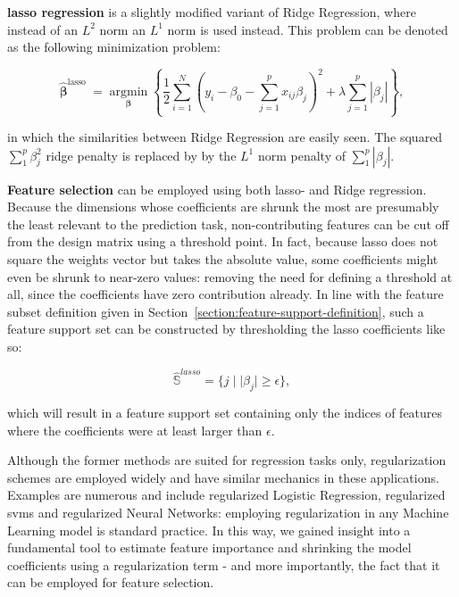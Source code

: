 \documentclass[../main.tex]{subfiles}
\begin{document}
\textbf{\gls{lasso} regression} is a slightly modified variant of Ridge Regression, where instead of an $L^2$ norm an $L^1$ norm is used instead. This problem can be denoted as the following minimization problem:

\begin{equation}
\hat{\boldsymbol{\beta}}^{\text {lasso }}=\underset{\boldsymbol{\beta}}{\operatorname{argmin}}\left\{\frac{1}{2} \sum_{i=1}^{N}\left(y_{i}-\beta_{0}-\sum_{j=1}^{p} x_{i j} \beta_{j}\right)^{2}+\lambda \sum_{j=1}^{p}\left|\beta_{j}\right|\right\},
\end{equation}

in which the similarities between Ridge Regression are easily seen. The squared $\sum_1^p \beta^2_j$ ridge penalty is replaced by by the $L^1$ norm penalty of $\sum_1^p |\beta_j|$.

\textbf{Feature selection} can be employed using both \gls{lasso}- and Ridge regression. Because the dimensions whose coefficients are shrunk the most are presumably the least relevant to the prediction task, non-contributing features can be cut off from the design matrix using a threshold point. In fact, because \gls{lasso} does not square the weights vector but takes the absolute value, some coefficients might even be shrunk to near-zero values: removing the need for defining a threshold at all, since the coefficients have zero contribution already. In line with the feature subset definition given in Section~\ref{section:feature-support-definition}, such a feature support set can be constructed by thresholding the \gls{lasso} coefficients like so:

\begin{equation}
\hat{\mathbb{S}}^{lasso} = \{ j \mid \lvert \beta_j \rvert \geq \epsilon \},
\end{equation}

which will result in a feature support set containing only the indices of features where the coefficients were at least larger than $\epsilon$.

Although the former methods are suited for regression tasks only, regularization schemes are employed widely and have similar mechanics in these applications. Examples are numerous and include regularized Logistic Regression, regularized \glspl{svm} and regularized Neural Networks: employing regularization in any Machine Learning model is standard practice. In this way, we gained insight into a fundamental tool to estimate feature importance and shrinking the model coefficients using a regularization term - and more importantly, the fact that it can be employed for feature selection.
\end{document}
